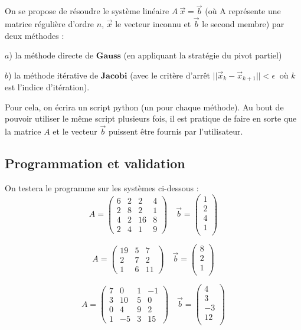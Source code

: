 \documentclass[11pt]{article}
\begin{document}
    On se propose de résoudre le système linéaire \(A\ \vec{x}=\vec{b}\) (où
A représente une matrice régulière d'ordre \(n\), \(\vec{x}\) le vecteur
inconnu et \(\vec{b}\) le second membre) par deux méthodes :

\(a\)) la méthode directe de \(\textbf{Gauss}\) (en appliquant la
stratégie du pivot partiel)

\(b\)) la méthode itérative de \(\textbf{Jacobi}\) (avec le critère
d'arrêt \(|| \vec{x}_{k} - \vec{x}_{k+1} || < \epsilon\ \) où \(k\) est
l'indice d'itération).

Pour cela, on écrira un script python (un pour chaque méthode). Au bout
de pouvoir utiliser le même script plusieurs fois, il est pratique de
faire en sorte que la matrice \(A\) et le vecteur \(\vec{b}\) puissent
être fournis par l'utilisateur.

    \subsection{Programmation et
validation}\label{programmation-et-validation}

    On testera le programme sur les systèmes ci-dessous : \[
{A}= 
\left( \begin{array}{cccc}
6 & 2 & 2 & 4 \\
2 & 8 & 2 & 1 \\
4 & 2 & 16 & 8\\
2 & 4 & 1 & 9
\end{array} \right)
\quad 
\vec{b} =
\left( \begin{array}{c}
1 \\
2 \\
4 \\
1 \\
\end{array} \right)
\]

\[
{A}= 
\left( \begin{array}{ccc}
19 & 5 & 7 \\
2 & 7 & 2 \\
1 & 6 & 11 
\end{array} \right)
\quad 
\vec{b} =
\left( \begin{array}{c}
8 \\
2 \\
1 \\
\end{array} \right)
\]

\[
{A}= 
\left( \begin{array}{cccc}
7 & 0 & 1 & -1 \\
3 & 10 & 5 & 0 \\
0 & 4 & 9 & 2\\
1 & -5 & 3 & 15
\end{array} \right)
\quad 
\vec{b} =
\left( \begin{array}{c}
4 \\
3 \\
-3 \\
12 \\
\end{array} \right)
\]
\end{document}
